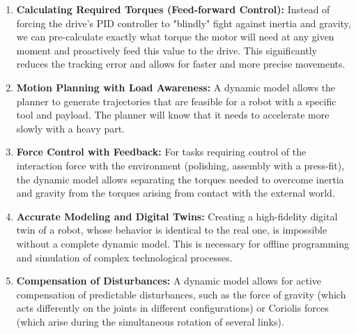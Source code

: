 \begin{enumerate}
    \item \textbf{Calculating Required Torques (Feed-forward Control):} Instead of forcing the drive's PID controller to "blindly" fight against inertia and gravity, we can pre-calculate exactly what torque the motor will need at any given moment and proactively feed this value to the drive. This significantly reduces the tracking error and allows for faster and more precise movements.

    \item \textbf{Motion Planning with Load Awareness:} A dynamic model allows the planner to generate trajectories that are feasible for a robot with a specific tool and payload. The planner will know that it needs to accelerate more slowly with a heavy part.

    \item \textbf{Force Control with Feedback:} For tasks requiring control of the interaction force with the environment (polishing, assembly with a press-fit), the dynamic model allows separating the torques needed to overcome inertia and gravity from the torques arising from contact with the external world.

    \item \textbf{Accurate Modeling and Digital Twins:} Creating a high-fidelity digital twin of a robot, whose behavior is identical to the real one, is impossible without a complete dynamic model. This is necessary for offline programming and simulation of complex technological processes.

    \item \textbf{Compensation of Disturbances:} A dynamic model allows for active compensation of predictable disturbances, such as the force of gravity (which acts differently on the joints in different configurations) or Coriolis forces (which arise during the simultaneous rotation of several links).
\end{enumerate}

